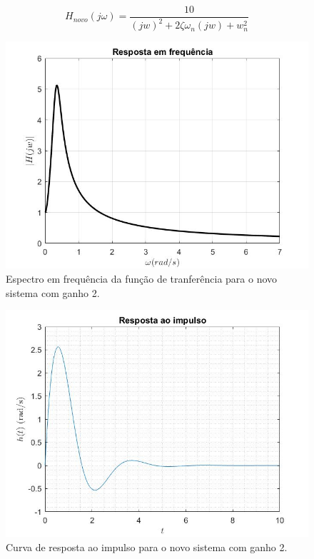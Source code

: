 \documentclass[a4paper,12pt,oneside,openany,table,xcdraw]{article}
\begin{document}
\vspace{0.4cm}
\begin{equation} \label{ex3:Hnovo:2}
H_{novo}(j\omega) = \dfrac{10}{(jw)^2 + 2 \zeta \omega_n (jw) + w_n ^2}
\end{equation}

\vspace{2cm}
\begin{figure}[H]
\centering
\includegraphics[width=14cm]{ex3-Hjw2}
\caption{Espectro em frequência da função de tranferência para o novo sistema com ganho 2.}
\label{ex3:Hjw:F}
\end{figure}

\vspace{0.2cm}
\begin{figure}[H]
\centering
\includegraphics[width=14cm]{ex3-ht2}
\caption{Curva de resposta ao impulso para o novo sistema com ganho 2.}
\label{ex3:ht:F}
\end{figure}
\end{document}
